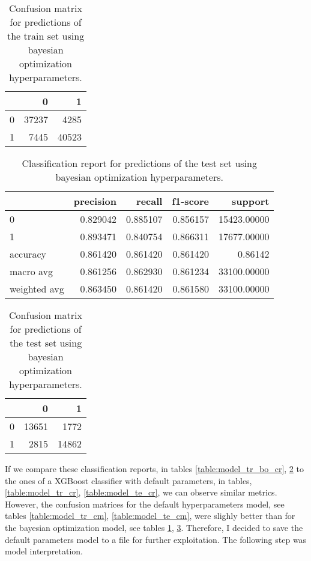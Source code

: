 \documentclass{article}
\begin{document}
\begin{itemize}
\begin{table}[h!]
\begin{tabular}{lrr}
\toprule
{} &      0 &      1 \\
\midrule
0 &  37237 &   4285 \\
1 &   7445 &  40523 \\
\bottomrule
\end{tabular}
\caption{Confusion matrix for predictions of the train set using bayesian optimization hyperparameters.}
\label{table:model_tr_bo_cm}
\end{table}

\begin{table}[h!]
\centering
\begin{tabular}{lrrrr}
\toprule
{} &  precision &    recall &  f1-score &      support \\
\midrule
0            &   0.829042 &  0.885107 &  0.856157 &  15423.00000 \\
1            &   0.893471 &  0.840754 &  0.866311 &  17677.00000 \\
accuracy     &   0.861420 &  0.861420 &  0.861420 &      0.86142 \\
macro avg    &   0.861256 &  0.862930 &  0.861234 &  33100.00000 \\
weighted avg &   0.863450 &  0.861420 &  0.861580 &  33100.00000 \\
\bottomrule
\end{tabular}
\caption{Classification report for predictions of the test set using bayesian optimization hyperparameters.}
\label{table:model_te_bo_cr}
\end{table}
 
\begin{table}[h!]
\centering
\begin{tabular}{lrr}
\toprule
{} &      0 &      1 \\
\midrule
0 &  13651 &   1772 \\
1 &   2815 &  14862 \\
\bottomrule
\end{tabular}
\caption{Confusion matrix for predictions of the test set using bayesian optimization hyperparameters.}
\label{table:model_te_bo_cm}
\end{table}

If we compare these classification reports, in tables \ref{table:model_tr_bo_cr}, \ref{table:model_te_bo_cr} to the ones of a XGBoost classifier with default parameters, in tables, \ref{table:model_tr_cr}, \ref{table:model_te_cr}, we can observe similar metrics. However, the confusion matrices for the default hyperparameters model, see tables \ref{table:model_tr_cm}, \ref{table:model_te_cm}, were slighly better than for the bayesian optimization model, see tables \ref{table:model_tr_bo_cm}, \ref{table:model_te_bo_cm}. Therefore, I decided to save the default parameters model to a file for further exploitation.  The following step was model interpretation.


\end{itemize}
\end{document}
